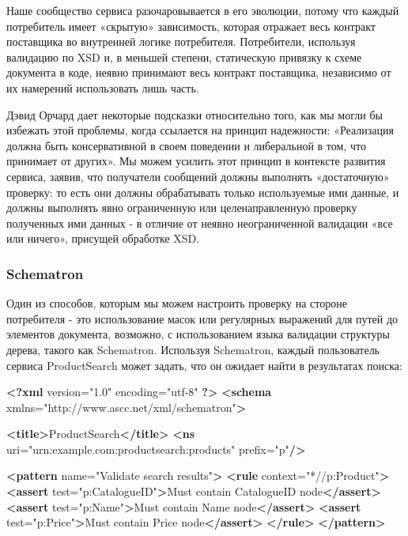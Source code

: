 \documentclass[11pt]{article}
\newenvironment{Shaded}{}{}
\newcommand{\KeywordTok}[1]{\textcolor[rgb]{0.00,0.44,0.13}{\textbf{{#1}}}}
\newcommand{\StringTok}[1]{\textcolor[rgb]{0.25,0.44,0.63}{{#1}}}
\newcommand{\OtherTok}[1]{\textcolor[rgb]{0.00,0.44,0.13}{{#1}}}
\newcommand{\NormalTok}[1]{{#1}}
\begin{document}
Наше сообщество сервиса разочаровывается в его эволюции, потому что
каждый потребитель имеет «скрытую» зависимость, которая отражает весь
контракт поставщика во внутренней логике потребителя. Потребители,
используя валидацию по XSD и, в меньшей степени, статическую привязку к
схеме документа в коде, неявно принимают весь контракт поставщика,
независимо от их намерений использовать лишь часть.

Дэвид Орчард дает некоторые подсказки относительно того, как мы могли бы
избежать этой проблемы, когда ссылается на принцип надежности:
«Реализация должна быть консервативной в своем поведении и либеральной в
том, что принимает от других». Мы можем усилить этот принцип в контексте
развития сервиса, заявив, что получатели сообщений должны выполнять
«достаточную» проверку: то есть они должны обрабатывать только
используемые ими данные, и должны выполнять явно ограниченную или
целенаправленную проверку полученных ими данных - в отличие от неявно
неограниченной валидации «все или ничего», присущей обработке XSD.

\subsubsection{Schematron}\label{schematron}

Один из способов, которым мы можем настроить проверку на стороне
потребителя - это использование масок или регулярных выражений для путей
до элементов документа, возможно, с использованием языка валидации
структуры дерева, такого как Schematron. Используя Schematron, каждый
пользователь сервиса ProductSearch может задать, что он ожидает найти в
результатах поиска:

\begin{Shaded}
\begin{Highlighting}[]
\KeywordTok{<?xml}\NormalTok{ version="1.0" encoding="utf-8" }\KeywordTok{?>}
\KeywordTok{<schema}\OtherTok{ xmlns=}\StringTok{"http://www.ascc.net/xml/schematron"}\KeywordTok{>}

  \KeywordTok{<title>}\NormalTok{ProductSearch}\KeywordTok{</title>}
  \KeywordTok{<ns}\OtherTok{ uri=}\StringTok{"urn:example.com:productsearch:products"}\OtherTok{ prefix=}\StringTok{"p"}\KeywordTok{/>}
  
  \KeywordTok{<pattern}\OtherTok{ name=}\StringTok{"Validate search results"}\KeywordTok{>}
    \KeywordTok{<rule}\OtherTok{ context=}\StringTok{"*//p:Product"}\KeywordTok{>}
      \KeywordTok{<assert}\OtherTok{ test=}\StringTok{"p:CatalogueID"}\KeywordTok{>}\NormalTok{Must contain CatalogueID node}\KeywordTok{</assert>}
      \KeywordTok{<assert}\OtherTok{ test=}\StringTok{"p:Name"}\KeywordTok{>}\NormalTok{Must contain Name node}\KeywordTok{</assert>}
      \KeywordTok{<assert}\OtherTok{ test=}\StringTok{"p:Price"}\KeywordTok{>}\NormalTok{Must contain Price node}\KeywordTok{</assert>}
    \KeywordTok{</rule>}
  \KeywordTok{</pattern>}
\end{Highlighting}
\end{Shaded}
\end{document}
